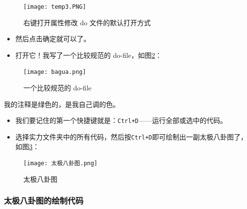 \documentclass[cn,fancy,blue,11pt]{elegantbook}
\begin{document}
\begin{figure}[htbp]
  \centering
  \texttt{[image: temp3.PNG]}
  \caption{右键打开属性修改 do 文件的默认打开方式}
  \label{fig:temp3}
\end{figure}

\begin{itemize}
\item
  然后点击确定就可以了。
\item
  打开它！我写了一个比较规范的 do-file，如图\ref{fig:bagua}：
\end{itemize}

\begin{figure}[htbp]
  \centering
  \texttt{[image: bagua.png]}
  \caption{一个比较规范的 do-file}
  \label{fig:bagua}
\end{figure}

我的注释是绿色的，是我自己调的色。

\begin{itemize}
\item
  我们要记住的第一个快捷键就是：\lstinline{Ctrl+D}------运行全部或选中的代码。
\item
  选择实力文件夹中的所有代码，然后按\lstinline{Ctrl+D}即可绘制出一副太极八卦图了，如图\ref{fig:bagua2}：
\end{itemize}

\begin{figure}[htbp]
  \centering
  \texttt{[image: 太极八卦图.png]}
  \caption{太极八卦图}
  \label{fig:bagua2}
\end{figure}

\hypertarget{section-10}{%
\subsubsection{太极八卦图的绘制代码}\label{section-10}}
\end{document}
